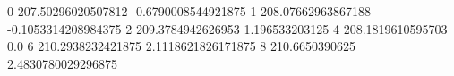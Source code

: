 0 207.50296020507812 -0.6790008544921875
1 208.07662963867188 -0.1053314208984375
2 209.3784942626953 1.196533203125
4 208.1819610595703 0.0
6 210.2938232421875 2.1118621826171875
8 210.6650390625 2.4830780029296875
